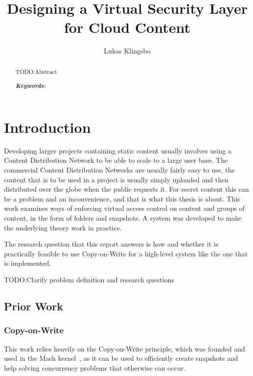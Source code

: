 \documentclass[a4paper,12pt]{article}
\title{\textbf{Designing a Virtual Security Layer for Cloud Content}}
\author{Lukas Klingsbo}
\newcommand{\fix}{\colorbox{yellow!30}{TODO:}}
\providecommand{\keywords}[1]{\textbf{\textit{Keywords: }} #1}
\begin{document}
\maketitle
%

\setcounter{page}{1}

%

\begin{abstract}
    \fix Abstract

\keywords{}
\end{abstract}

\newpage\null\thispagestyle{empty}\newpage

\setcounter{tocdepth}{3}
\tableofcontents

\clearpage
{}
\setcounter{page}{1}

\section{Introduction}
Developing larger projects containing static content usually involves using a Content Distribution
Network to be able to scale to a large user base. The commercial Content Distribution Networks are
usually fairly easy to use, the content that is to be used in a project is usually simply uploaded
and then distributed over the globe when the public requests it. For secret content this can be a
problem and an inconvenience, and that is what this thesis is about. This work examines ways of
enforcing virtual access control on content and groups of content, in the form of folders and
snapshots. A system was developed to make the underlying theory work in practice. 

The research question that this report answers is how and whether it is practically feasible to use
Copy-on-Write for a high-level system like the one that is implemented. 

\fix Clarify problem definition and research questions

\subsection{Prior Work}
\subsubsection{Copy-on-Write}
This work relies heavily on the Copy-on-Write principle, which was founded and used in the Mach
kernel~\cite{COPYONWRITE}, as it can be used to efficiently create snapshots and help solving
concurrency problems that otherwise can occur.
\end{document}
